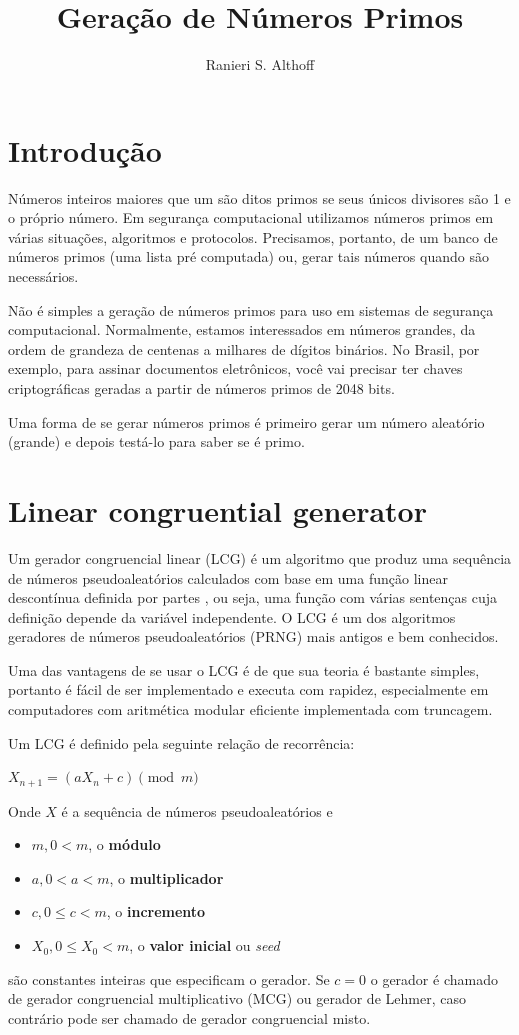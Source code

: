 \documentclass[12pt]{article}
\title{Geração de Números Primos}
\author{Ranieri S. Althoff\inst{1}}
\begin{document}
\maketitle

\section{Introdução}\label{sec:firstpage}

Números inteiros maiores que um são ditos primos se seus únicos divisores são 1
e o próprio número. Em segurança computacional utilizamos números primos em
várias situações, algoritmos e protocolos. Precisamos, portanto, de um banco de
números primos (uma lista pré computada) ou, gerar tais números quando são
necessários.

Não é simples a geração de números primos para uso em sistemas de segurança
computacional. Normalmente, estamos interessados em números grandes, da ordem
de grandeza de centenas a milhares de dígitos binários. No Brasil, por exemplo,
para assinar documentos eletrônicos, você vai precisar ter chaves
criptográficas geradas a partir de números primos de 2048 bits.

Uma forma de se gerar números primos é primeiro gerar um número aleatório
(grande) e depois testá-lo para saber se é primo.

\section{Linear congruential generator}

Um gerador congruencial linear (LCG) é um algoritmo que produz uma sequência de
números pseudoaleatórios calculados com base em uma função linear descontínua
definida por partes \cite{knuth:97}, ou seja, uma função com várias sentenças
cuja definição depende da variável independente. O LCG é um dos algoritmos
geradores de números pseudoaleatórios (PRNG) mais antigos e bem conhecidos.

Uma das vantagens de se usar o LCG é de que sua teoria é bastante simples,
portanto é fácil de ser implementado e executa com rapidez, especialmente em
computadores com aritmética modular eficiente implementada com truncagem.

Um LCG é definido pela seguinte relação de recorrência:
\begin{center}
    $X_{n+1} = \left( aX_n + c \right) \pmod{m}$
\end{center}
Onde $X$ é a sequência de números pseudoaleatórios e
\begin{itemize}
    \item $m, 0 < m$, o \textbf{módulo}
    \item $a, 0 < a < m$, o \textbf{multiplicador}
    \item $c, 0 \leq c < m$, o \textbf{incremento}
    \item $X_0, 0 \leq X_0 < m$, o \textbf{valor inicial} ou \textit{seed}
\end{itemize}
são constantes inteiras que especificam o gerador. Se $c = 0$ o gerador é
chamado de gerador congruencial multiplicativo (MCG) ou gerador de Lehmer, caso
contrário pode ser chamado de gerador congruencial misto.
\end{document}
